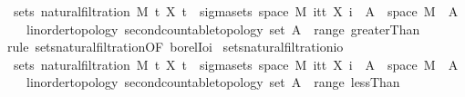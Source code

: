 \begin{isabellebody}
\ \ {\isachardoublequoteopen}sets\ {\isacharparenleft}{\kern0pt}natural{\isacharunderscore}{\kern0pt}filtration\ M\ t\ X\ t{\isacharparenright}{\kern0pt}\ {\isacharequal}{\kern0pt}\ sigma{\isacharunderscore}{\kern0pt}sets\ {\isacharparenleft}{\kern0pt}space\ M{\isacharparenright}{\kern0pt}\ {\isacharparenleft}{\kern0pt}{\isasymUnion}i{\isasymin}{\isacharbraceleft}{\kern0pt}tt{\isacharbraceright}{\kern0pt}{\isachardot}{\kern0pt}\ {\isacharbraceleft}{\kern0pt}X\ i\ {\isacharminus}{\kern0pt}{\isacharbackquote}{\kern0pt}\ A\ {\isasyminter}\ space\ M\ {\isacharbar}{\kern0pt}\ A\ {\isacharcolon}{\kern0pt}{\isacharcolon}{\kern0pt}\ {\isacharunderscore}{\kern0pt}\ {\isacharcolon}{\kern0pt}{\isacharcolon}{\kern0pt}\ {\isacharbraceleft}{\kern0pt}linorder{\isacharunderscore}{\kern0pt}topology{\isacharcomma}{\kern0pt}\ second{\isacharunderscore}{\kern0pt}countable{\isacharunderscore}{\kern0pt}topology{\isacharbraceright}{\kern0pt}\ set{\isachardot}{\kern0pt}\ A\ {\isasymin}\ range\ greaterThan{\isacharbraceright}{\kern0pt}{\isacharparenright}{\kern0pt}{\isachardoublequoteclose}\ \isanewline
%
\isadelimproof
\ \ %
\endisadelimproof
%
\isatagproof
{}\isamarkupfalse%
\ {\isacharparenleft}{\kern0pt}rule\ sets{\isacharunderscore}{\kern0pt}natural{\isacharunderscore}{\kern0pt}filtration{\isacharprime}{\kern0pt}{\isacharbrackleft}{\kern0pt}OF\ borel{\isacharunderscore}{\kern0pt}Ioi{\isacharbrackright}{\kern0pt}{\isacharparenright}{\kern0pt}%
\endisatagproof
{\isafoldproof}%
%
\isadelimproof
\isanewline
%
\endisadelimproof
\isanewline
{}\isamarkupfalse%
\ sets{\isacharunderscore}{\kern0pt}natural{\isacharunderscore}{\kern0pt}filtration{\isacharunderscore}{\kern0pt}io{\isacharcolon}{\kern0pt}\isanewline
\ \ {\isachardoublequoteopen}sets\ {\isacharparenleft}{\kern0pt}natural{\isacharunderscore}{\kern0pt}filtration\ M\ t\ X\ t{\isacharparenright}{\kern0pt}\ {\isacharequal}{\kern0pt}\ sigma{\isacharunderscore}{\kern0pt}sets\ {\isacharparenleft}{\kern0pt}space\ M{\isacharparenright}{\kern0pt}\ {\isacharparenleft}{\kern0pt}{\isasymUnion}i{\isasymin}{\isacharbraceleft}{\kern0pt}tt{\isacharbraceright}{\kern0pt}{\isachardot}{\kern0pt}\ {\isacharbraceleft}{\kern0pt}X\ i\ {\isacharminus}{\kern0pt}{\isacharbackquote}{\kern0pt}\ A\ {\isasyminter}\ space\ M\ {\isacharbar}{\kern0pt}\ A\ {\isacharcolon}{\kern0pt}{\isacharcolon}{\kern0pt}\ {\isacharunderscore}{\kern0pt}\ {\isacharcolon}{\kern0pt}{\isacharcolon}{\kern0pt}\ {\isacharbraceleft}{\kern0pt}linorder{\isacharunderscore}{\kern0pt}topology{\isacharcomma}{\kern0pt}\ second{\isacharunderscore}{\kern0pt}countable{\isacharunderscore}{\kern0pt}topology{\isacharbraceright}{\kern0pt}\ set{\isachardot}{\kern0pt}\ A\ {\isasymin}\ range\ lessThan{\isacharbraceright}{\kern0pt}{\isacharparenright}{\kern0pt}{\isachardoublequoteclose}\ \isanewline

\end{isabellebody}
